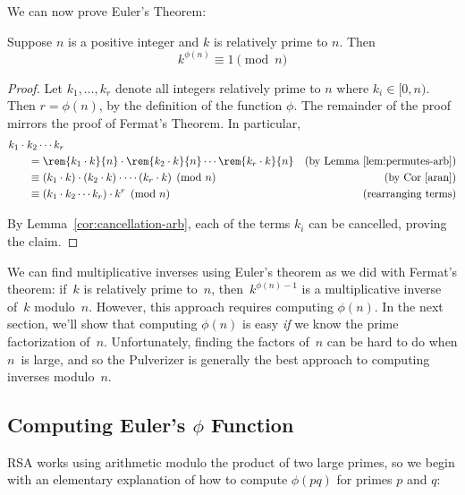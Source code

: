 We can now prove Euler's Theorem:

\begin{theorem}
Suppose $n$ is a positive integer and $k$ is relatively prime to $n$.  Then
\begin{equation*}
    k^{\phi(n)} \equiv 1 \pmod{n}
\end{equation*}
\end{theorem}

\begin{proof}
Let $k_1, \dots, k_r$ denote all integers relatively prime to $n$ where $ k_i\in [0, n)$.
  Then $r = \phi(n)$, by the definition of the function $\phi$.  The remainder of the proof
  mirrors the proof of Fermat's Theorem.  In particular,
\begin{align*}
\lefteqn{k_1 \cdot k_2 \cdots k_r} \hspace{0.25in} \\ & = \rem{k_1 \cdot k}{n} \cdot
\rem{k_2 \cdot k}{n} \cdots \rem{k_r \cdot k}{n} & \text{(by Lemma~\ref{lem:permutes-arb})}
\\ & \equiv (k_1 \cdot k) \cdot (k_2 \cdot k) \cdot \cdots (k_r \cdot k) \pmod{n} &
\text{(by Cor~\ref{aran})} \\ & \equiv (k_1 \cdot k_2 \cdots k_r) \cdot k^r \pmod{n} &
\text{(rearranging terms)}
\end{align*}

By Lemma~\ref{cor:cancellation-arb}, each of the terms $k_i$ can be cancelled, proving the
claim.
\end{proof}

We can find multiplicative inverses using Euler's theorem as we did with Fermat's theorem:
if~$k$ is relatively prime to~$n$, then~$k^{\phi(n)-1}$ is a multiplicative inverse of~$k$
modulo~$n$.  However, this approach requires computing $\phi(n)$.  In the next section,
we'll show that computing $\phi(n)$ is easy \emph{if} we know the prime factorization
of~$n$.  Unfortunately, finding the factors of~$n$ can be hard to do when $n$~is large, and
so the Pulverizer is generally the best approach to computing inverses modulo~$n$.

\subsection{Computing Euler's $\phi$ Function}

RSA works using arithmetic modulo the product of two large primes, so we begin with an
elementary explanation of how to compute $\phi(pq)$ for primes $p$ and $q$:

